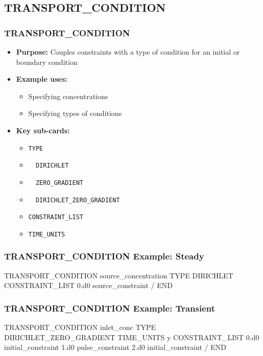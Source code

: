 \subsection{TRANSPORT\_CONDITION}

\begin{frame}\frametitle{TRANSPORT\_CONDITION}

\begin{itemize}
\item[] \textbf{Purpose:} Couples constraints with a type of condition for an initial or boundary condition
\item[] \textbf{Example uses:}
\begin{itemize}
  \item Specifying concentrations 
  \item Specifying types of conditions
\end{itemize}
\item[] \textbf{Key sub-cards:}
\begin{itemize}
  \item[] \verb|TYPE|
  \item[] \verb|  DIRICHLET|
  \item[] \verb|  ZERO_GRADIENT|
  \item[] \verb|  DIRICHLET_ZERO_GRADIENT|
  \item[] \verb|CONSTRAINT_LIST|
  \item[] \verb|TIME_UNITS|
\end{itemize}
\end{itemize}

\end{frame}

\begin{frame}[fragile]\frametitle{TRANSPORT\_CONDITION Example: Steady}

\begin{semiverbatim}
TRANSPORT_CONDITION source_concentration
  TYPE DIRICHLET
  CONSTRAINT_LIST
    0.d0 source_constraint
  /
END
\end{semiverbatim}

\end{frame}

\begin{frame}[fragile]\frametitle{TRANSPORT\_CONDITION Example: Transient}

\begin{semiverbatim}
TRANSPORT_CONDITION inlet_conc
  TYPE DIRICHLET_ZERO_GRADIENT
  TIME_UNITS y
  CONSTRAINT_LIST
    0.d0 initial_constraint
    1.d0 pulse_constraint
    2.d0 initial_constraint
  /
END
\end{semiverbatim}

\end{frame}
